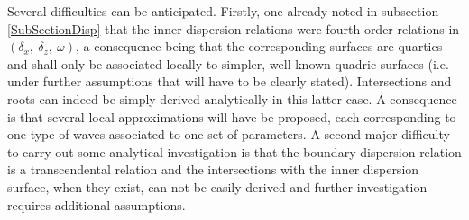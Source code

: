 \documentclass[a4paper,11pt]{article}
\begin{document}
Several difficulties can be anticipated. Firstly, one already noted in subsection \ref{SubSectionDisp} that the inner dispersion relations were fourth-order relations in $(\delta_x,\ \delta_z,\ \omega)$, a consequence being that the corresponding surfaces are quartics and shall only be associated locally to simpler, well-known quadric surfaces (i.e. under further assumptions that will have to be clearly stated). Intersections and roots can indeed be simply derived analytically in this latter case. A consequence is that several local approximations will have be proposed, each corresponding to one type of waves associated to one set of parameters. A second major difficulty to carry out some analytical investigation is that the boundary dispersion relation is a transcendental relation and the intersections with the inner dispersion surface, when they exist, can not be easily derived and further investigation  requires additional assumptions.\\ 
\end{document}
